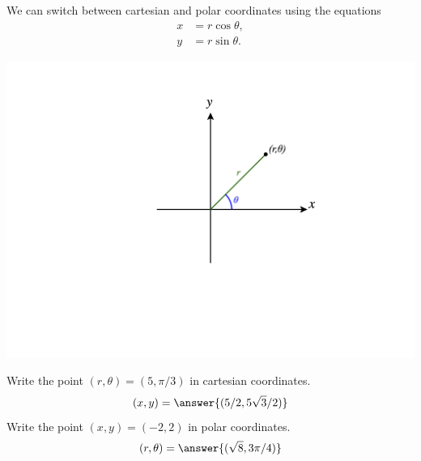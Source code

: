\documentclass{ximera}
\begin{document}
We can switch between cartesian and polar coordinates using the equations
\begin{align*}
x&=r\cos\theta,\\
y&=r\sin\theta.
\end{align*}

\begin{image}
\includegraphics[width=\textwidth]{CalcPlot3D-polar}
\end{image}

\begin{problem}
Write the point $(r,\theta) = (5, \pi/3)$ in cartesian coordinates.
\[
(x,y) = \answer{(5/2, 5\sqrt{3}/2)}
\]
Write the point $(x,y) = (-2,2)$ in polar coordinates.
\[
(r,\theta) = \answer{(\sqrt{8}, 3\pi/4)}
\]
\end{problem}
\end{document}
